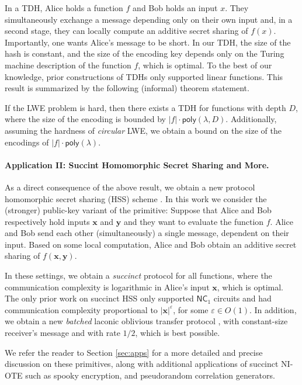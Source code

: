 \documentclass{theoretics}
\newcommand{\poly}{\mathsf{poly}}
\renewcommand{\sec}{\ensuremath{\lambda}}
\begin{document}
{In a TDH, Alice holds a function $f$ and Bob holds an input $x$. They simultaneously exchange a message depending only on their own input and, in a second stage, they can locally compute an additive secret sharing of $f(x)$. Importantly, one wants Alice's message to be short. In our TDH, the} size of the hash is constant, and the size of the encoding key depends only on the {Turing machine} description of the function $f$, which is optimal. {To the best of our knowledge, prior constructions of TDHs \cite{C:DGIMMO19,C:RoySin21} only supported linear functions.}
This result is summarized by the following (informal) theorem statement.
\begin{theorem}[Informal]
    If the LWE problem is hard, then there exists a TDH for functions with depth $D$, where the size of the encoding is bounded by {$|f|\cdot \poly(\sec, D)$}. Additionally, assuming the hardness of \emph{circular} LWE, we obtain a bound on the size of the encodings of $|f|\cdot \poly(\sec)$.
\end{theorem}



\paragraph{Application II: Succint Homomorphic Secret Sharing and More.}
As a direct consequence of the above result, we obtain a new protocol homomorphic secret sharing (HSS) scheme \cite{C:BoyGilIsh16}. {In this work we consider the (stronger) public-key variant of the primitive: Suppose that Alice and Bob respectively hold inputs $\mathbf{x}$ and $\mathbf{y}$ and they want to evaluate the function $f$. Alice and Bob send each other (simultaneously) a single message, dependent on their input. Based on some local computation, Alice and Bob obtain an additive secret sharing of $f(\mathbf{x}, \mathbf{y})$.}

{In these settings, we obtain a \emph{succinct} \cite{EC:AbrRoySch24} protocol for all functions, where the communication complexity is logarithmic in Alice's input} $\mathbf{x}$, which is optimal. The only prior work on succinct HSS \cite{EC:AbrRoySch24} only supported $\mathsf{NC}_1$ circuits and had communication complexity proportional to $\lvert \mathbf{x}\rvert^\varepsilon$, for some $\varepsilon\in O(1)$. In addition, we obtain a new \emph{batched} laconic oblivious transfer protocol \cite{C:CDGGMP17}, with constant-size receiver's message and with rate $1/2$, which is best possible. 

We refer the reader to Section \ref{sec:apps} for a more detailed and precise discussion on these primitives, along with additional applications of succinct NI-OTE such as spooky encryption, and pseudorandom correlation generators.
\end{document}
